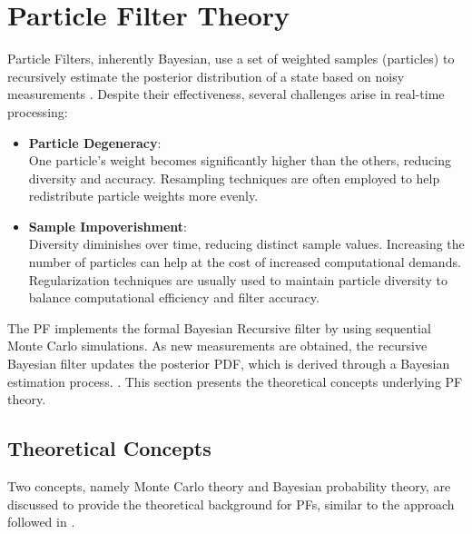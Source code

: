 \newpage
\section{Particle  Filter Theory} 
Particle Filters, inherently Bayesian, use a set of weighted samples (particles) to recursively estimate the posterior distribution of a state based on noisy measurements \cite{Zhang2009}. Despite their effectiveness, several challenges arise in real-time processing:
\begin{itemize}
    \item \textbf{Particle Degeneracy}:\\
    One particle's weight becomes significantly higher than the others, reducing diversity and accuracy. Resampling techniques are often employed to help redistribute particle weights more evenly.
    \item \textbf{Sample Impoverishment}:\\
    Diversity diminishes over time, reducing distinct sample values. Increasing the number of particles can help at the cost of increased computational demands. Regularization techniques are usually used to maintain particle diversity to balance computational efficiency and filter accuracy.
\end{itemize}
The \ac{PF} implements the formal Bayesian Recursive filter by using sequential Monte Carlo simulations. As new measurements are obtained, the recursive Bayesian filter updates the posterior \ac{PDF}, which is derived through a Bayesian estimation process. \cite{Bauermeister2016}. This section presents the theoretical concepts underlying \ac{PF} theory.

\subsection{Theoretical Concepts}
Two concepts, namely  Monte Carlo theory and Bayesian probability theory, are discussed to provide the theoretical background for \ac{PF}s, similar to the approach followed in \cite{Bauermeister2016}.

